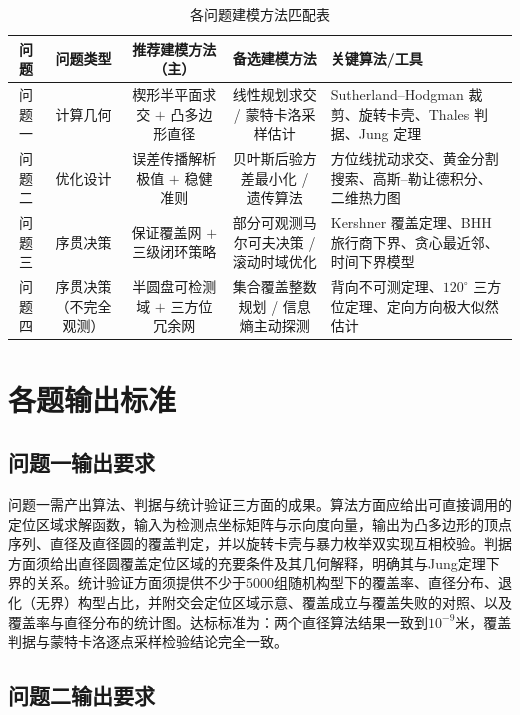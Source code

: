\documentclass[12pt,a4paper]{ctexart}
\begin{document}
\begin{table}[htbp]
    \centering
    \caption{各问题建模方法匹配表}
    \label{tab:method_match}
    \begin{tabularx}{\textwidth}{CCCCL}
        \toprule
        问题 & 问题类型 & 推荐建模方法（主） & 备选建模方法 & 关键算法/工具 \\
        \midrule
        问题一 & 计算几何 & 楔形半平面求交 $+$ 凸多边形直径 & 线性规划求交 / 蒙特卡洛采样估计 & Sutherland--Hodgman 裁剪、旋转卡壳、Thales 判据、Jung 定理 \\
        \midrule
        问题二 & 优化设计 & 误差传播解析极值 $+$ 稳健准则 & 贝叶斯后验方差最小化 / 遗传算法 & 方位线扰动求交、黄金分割搜索、高斯--勒让德积分、二维热力图 \\
        \midrule
        问题三 & 序贯决策 & 保证覆盖网 $+$ 三级闭环策略 & 部分可观测马尔可夫决策 / 滚动时域优化 & Kershner 覆盖定理、BHH 旅行商下界、贪心最近邻、时间下界模型 \\
        \midrule
        问题四 & 序贯决策（不完全观测） & 半圆盘可检测域 $+$ 三方位冗余网 & 集合覆盖整数规划 / 信息熵主动探测 & 背向不可测定理、$120^\circ$ 三方位定理、定向方向极大似然估计 \\
        \bottomrule
    \end{tabularx}
\end{table}

\section{各题输出标准}

\subsection{问题一输出要求}

问题一需产出算法、判据与统计验证三方面的成果。算法方面应给出可直接调用的定位区域求解函数，输入为检测点坐标矩阵与示向度向量，输出为凸多边形的顶点序列、直径及直径圆的覆盖判定，并以旋转卡壳与暴力枚举双实现互相校验。判据方面须给出直径圆覆盖定位区域的充要条件及其几何解释，明确其与Jung定理下界的关系。统计验证方面须提供不少于$5000$组随机构型下的覆盖率、直径分布、退化（无界）构型占比，并附交会定位区域示意、覆盖成立与覆盖失败的对照、以及覆盖率与直径分布的统计图。达标标准为：两个直径算法结果一致到$10^{-9}$米，覆盖判据与蒙特卡洛逐点采样检验结论完全一致。

\subsection{问题二输出要求}
\end{document}
